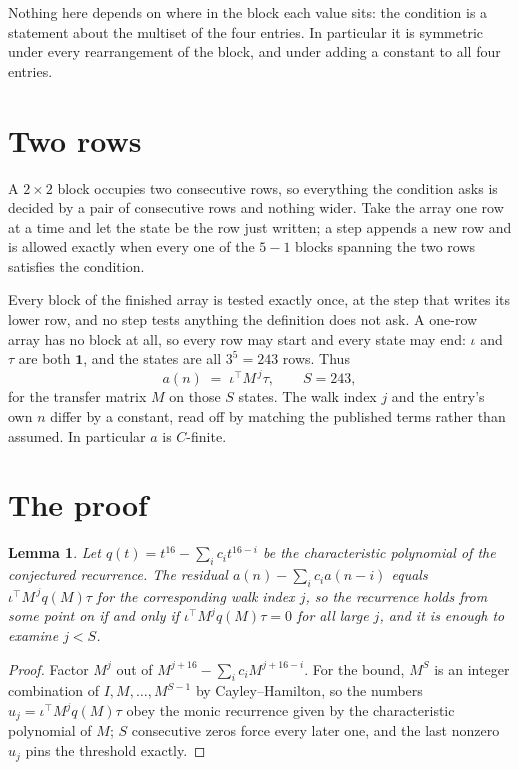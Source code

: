 \documentclass[11pt,a4paper]{article}
\theoremstyle{plain}
\newtheorem{lemma}[theorem]{Lemma}
\theoremstyle{definition}
\begin{document}
Nothing here depends on where in the block each value sits: the condition is a statement about
the multiset of the four entries. In particular it is symmetric under every rearrangement of
the block, and under adding a constant to all four entries.

\section{Two rows}

A $2\times2$ block occupies two consecutive rows, so everything the condition asks is decided
by a pair of consecutive rows and nothing wider. Take the array one row at a time and let the
state be the row just written; a step appends a new row and is allowed exactly when every one
of the $5-1$ blocks spanning the two rows satisfies the condition.

Every block of the finished array is tested exactly once, at the step that writes its lower
row, and no step tests anything the definition does not ask. A one-row array has no block at
all, so every row may start and every state may end: $\iota$ and $\tau$ are both
$\mathbf{1}$, and the states are all $3^{5}=243$ rows. Thus
\[
a(n)\;=\;\iota^{\!\top}M^{\,j}\tau ,\qquad S=243,
\]
for the transfer matrix $M$ on those $S$ states. The walk index $j$ and the entry's own $n$
differ by a constant, read off by matching the published terms rather than assumed. In
particular $a$ is $C$-finite.

\section{The proof}

\begin{lemma}\label{lem:crit}
Let $q(t)=t^{16}-\sum_i c_it^{16-i}$ be the characteristic polynomial of the
conjectured recurrence. The residual $a(n)-\sum_ic_ia(n-i)$ equals
$\iota^{\!\top}M^{\,j}q(M)\tau$ for the corresponding walk index $j$, so the recurrence
holds from some point on if and only if $\iota^{\!\top}M^{j}q(M)\tau=0$ for all large $j$,
and it is enough to examine $j<S$.
\end{lemma}

\begin{proof}
Factor $M^{j}$ out of $M^{j+16}-\sum_ic_iM^{j+16-i}$. For the bound, $M^{S}$
is an integer combination of $I,M,\dots,M^{S-1}$ by Cayley--Hamilton, so the numbers
$u_j=\iota^{\!\top}M^{j}q(M)\tau$ obey the monic recurrence given by the characteristic
polynomial of $M$; $S$ consecutive zeros force every later one, and the last nonzero $u_j$
pins the threshold exactly.
\end{proof}
\end{document}
